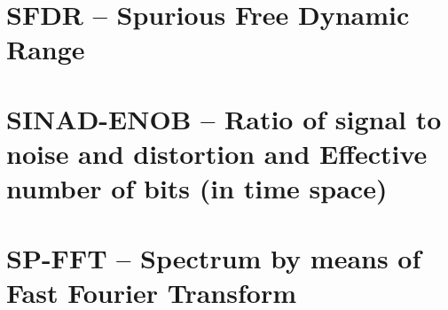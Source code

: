 \documentclass[12pt,a4paper,oneside]{report} %
\begin{document}
\section*{\infosection} %

\section*{\examplesection} %


\chapter{SFDR -- Spurious Free Dynamic Range} %
\section*{\infosection} %

\section*{\examplesection} %


\chapter{SINAD-ENOB -- Ratio of signal to noise and distortion and Effective number of bits (in time space)} %
\section*{\infosection} %

\section*{\examplesection} %


\chapter{SP-FFT -- Spectrum by means of Fast Fourier Transform} %
\section*{\infosection} %

\section*{\examplesection} %

\end{document}
